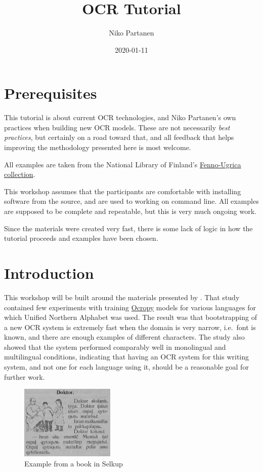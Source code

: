 \documentclass[]{book}
\title{OCR Tutorial}
\author{Niko Partanen}
\date{2020-01-11}
\begin{document}
\maketitle

{
\setcounter{tocdepth}{1}
\tableofcontents
}
\hypertarget{prerequisites}{%
\chapter{Prerequisites}\label{prerequisites}}

This tutorial is about current OCR technologies, and Niko Partanen's own practices when building new OCR models. These are not necessarily \emph{best practices}, but certainly on a road toward that, and all feedback that helps improving the methodology presented here is most welcome.

All examples are taken from the National Library of Finland's \href{https://fennougrica.kansalliskirjasto.fi/}{Fenno-Ugrica collection}.

This workshop assumes that the participants are comfortable with installing software from the source, and are used to working on command line. All examples are supposed to be complete and repeatable, but this is very much ongoing work.

Since the materials were created very fast, there is some lack of logic in how the tutorial proceeds and examples have been chosen.

\hypertarget{intro}{%
\chapter{Introduction}\label{intro}}

This workshop will be built around the materials presented by \citet{partanen2019ocr}. That study contained few experiments with training \href{https://github.com/tmbdev/ocropy}{Ocropy} models for various languages for which Unified Northern Alphabet was used. The result was that bootstrapping of a new OCR system is extremely fast when the domain is very narrow, i.e.~font is known, and there are enough examples of different characters. The study also showed that the system performed comparably well in monolingual and multilingual conditions, indicating that having an OCR system for this writing system, and not one for each language using it, should be a reasonable goal for further work.

\begin{figure}
\centering
\includegraphics[width=0.4\textwidth,height=\textheight]{images/doctor_sel.png}
\caption{Example from a book in Selkup}
\end{figure}
\end{document}
